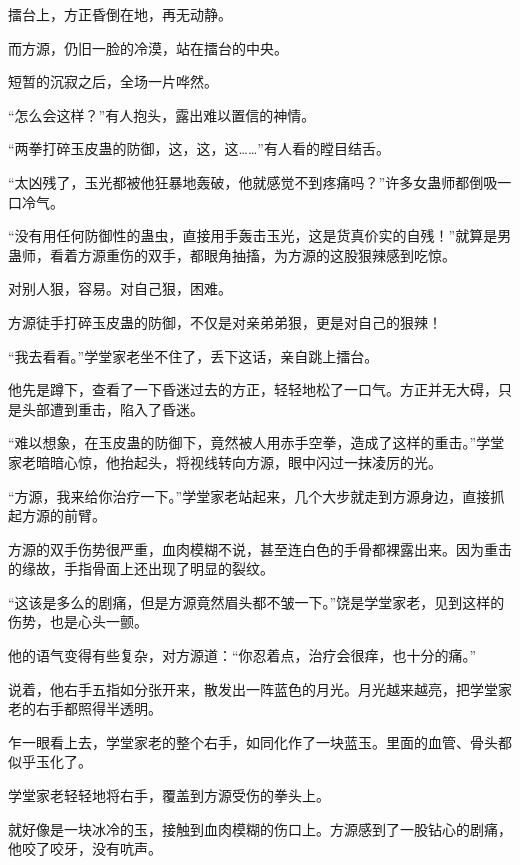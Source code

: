 
\begin{this_body}



擂台上，方正昏倒在地，再无动静。

而方源，仍旧一脸的冷漠，站在擂台的中央。

短暂的沉寂之后，全场一片哗然。

“怎么会这样？”有人抱头，露出难以置信的神情。

“两拳打碎玉皮蛊的防御，这，这，这……”有人看的瞠目结舌。

“太凶残了，玉光都被他狂暴地轰破，他就感觉不到疼痛吗？”许多女蛊师都倒吸一口冷气。

“没有用任何防御性的蛊虫，直接用手轰击玉光，这是货真价实的自残！”就算是男蛊师，看着方源重伤的双手，都眼角抽搐，为方源的这股狠辣感到吃惊。

对别人狠，容易。对自己狠，困难。

方源徒手打碎玉皮蛊的防御，不仅是对亲弟弟狠，更是对自己的狠辣！

“我去看看。”学堂家老坐不住了，丢下这话，亲自跳上擂台。

他先是蹲下，查看了一下昏迷过去的方正，轻轻地松了一口气。方正并无大碍，只是头部遭到重击，陷入了昏迷。

“难以想象，在玉皮蛊的防御下，竟然被人用赤手空拳，造成了这样的重击。”学堂家老暗暗心惊，他抬起头，将视线转向方源，眼中闪过一抹凌厉的光。

“方源，我来给你治疗一下。”学堂家老站起来，几个大步就走到方源身边，直接抓起方源的前臂。

方源的双手伤势很严重，血肉模糊不说，甚至连白色的手骨都裸露出来。因为重击的缘故，手指骨面上还出现了明显的裂纹。

“这该是多么的剧痛，但是方源竟然眉头都不皱一下。”饶是学堂家老，见到这样的伤势，也是心头一颤。

他的语气变得有些复杂，对方源道：“你忍着点，治疗会很痒，也十分的痛。”

说着，他右手五指如分张开来，散发出一阵蓝色的月光。月光越来越亮，把学堂家老的右手都照得半透明。

乍一眼看上去，学堂家老的整个右手，如同化作了一块蓝玉。里面的血管、骨头都似乎玉化了。

学堂家老轻轻地将右手，覆盖到方源受伤的拳头上。

就好像是一块冰冷的玉，接触到血肉模糊的伤口上。方源感到了一股钻心的剧痛，他咬了咬牙，没有吭声。


\end{this_body}
